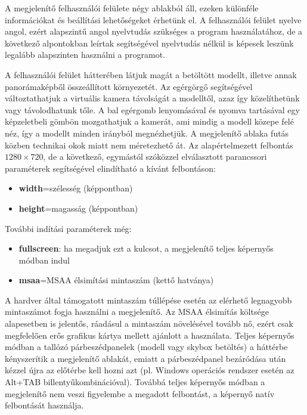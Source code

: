 A megjelenítő felhasználói felülete négy ablakból áll, ezeken különféle információkat és beállítási lehetőségeket érhetünk el. A felhasználói felület nyelve angol, ezért alapszintű angol nyelvtudás szükséges a program használatához, de a következő alpontokban leírtak segítségével nyelvtudás nélkül is képesek leszünk legalább alapszinten használni a programot.

A felhasználói felület hátterében látjuk magát a betöltött modellt, illetve annak panorámaképből összeállított környezetét. Az egérgörgő segítségével változtathatjuk a virtuális kamera távolságát a modelltől, azaz így közelíthetünk vagy távolodhatunk tőle. A bal egérgomb lenyomásával és nyomva tartásával egy képzeletbeli gömbön mozgathatjuk a kamerát, ami mindig a modell közepe felé néz, így a modellt minden irányból megnézhetjük. A megjelenítő ablaka futás közben technikai okok miatt nem méretezhető át. Az alapértelmezett felbontás \(1280 \times 720\), de a következő, egymástól szóközzel elválasztott parancssori paraméterek segítségével elindítható a kívánt felbontáson:

\begin{itemize}[noitemsep]
\item \textbf{width}=szélesség (képpontban)
\item \textbf{height}=magasság (képpontban)
\end{itemize}

\noindent
További indítási paraméterek még:

\begin{itemize}[noitemsep]
\item \textbf{fullscreen}: ha megadjuk ezt a kulcsot, a megjelenítő teljes képernyős módban indul
\item \textbf{msaa}=MSAA élsimítási mintaszám (kettő hatványa)
\end{itemize}

A hardver által támogatott mintaszám túllépése esetén az elérhető legnagyobb mintaszámot fogja használni a megjelenítő. Az MSAA élsimítás költsége alapesetben is jelentős, ráadásul a mintaszám növelésével tovább nő, ezért csak megfelelően erős grafikus kártya mellett ajánlott a használata. Teljes képernyős módban a tallózó párbeszédpanelek (modell vagy skybox betöltés) a háttérbe kényszerítik a megjelenítő ablakát, emiatt a párbeszédpanel bezáródása után kézzel újra az előtérbe kell hozni azt (pl. Windows operációs rendszer esetén az Alt+TAB billentyűkombinációval). Továbbá teljes képernyős módban a megjelenítő nem veszi figyelembe a megadott felbontást, a képernyő natív felbontását használja.

